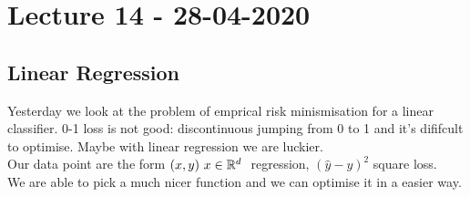\documentclass[../main.tex]{subfiles}
\begin{document}
\chapter{Lecture 14 - 28-04-2020}

\section{Linear Regression}
Yesterday we look at the problem of emprical risk  minismisation for a linear classifier. 0-1 loss is not good: discontinuous jumping from 0 to 1 and it's dififcult to optimise. Maybe with linear regression we are luckier.
\\
Our data point are the form $(x,y) \ x \in \mathbb{R}^d \ $ regression, $(\hat{y}-y)^2$ square loss. 
\\
We are able to pick a much nicer function and we can optimise it in a easier way.
\\
\end{document}
